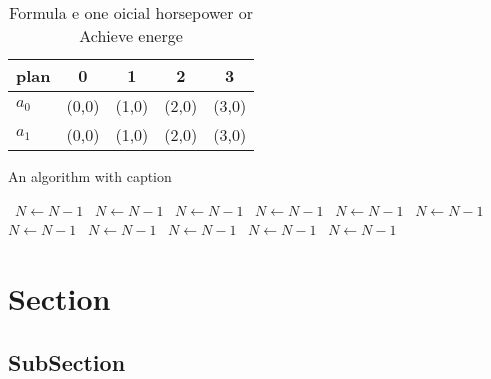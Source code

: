 \documentclass[a4paper]{article}
\begin{document}
\begin{table}
\begin{adjustbox}{width=0.8\columnwidth}
\begin{tabular}{|l|l|l|l|l|}
\hline
\textbf{plan} & \multicolumn{1}{c|}{\textbf{0}} & \multicolumn{1}{c|}{\textbf{1}} & \multicolumn{1}{c|}{\textbf{2}} & \multicolumn{1}{c|}{\textbf{3}} \\ \hline
\textbf{$a_0$}  & (0,0) & (1,0) & (2,0) & (3,0) \\ \hline
\textbf{$a_1$}  & (0,0) & (1,0) & (2,0) & (3,0) \\ \hline
\end{tabular}
\end{adjustbox}
\caption{Formula e one oicial horsepower or Achieve energe
}
\end{table}

\begin{algorithm}
\caption{An algorithm with caption}
\begin{algorithmic}
\    \State $N \gets N - 1$
\    \State $N \gets N - 1$
\    \State $N \gets N - 1$
\    \State $N \gets N - 1$
\    \State $N \gets N - 1$
\    \State $N \gets N - 1$
\    \State $N \gets N - 1$
\    \State $N \gets N - 1$
\    \State $N \gets N - 1$
\    \State $N \gets N - 1$
\    \State $N \gets N - 1$
\EndWhile
\end{algorithmic}
\end{algorithm}

\section{Section}

\subsection{SubSection}
\end{document}
